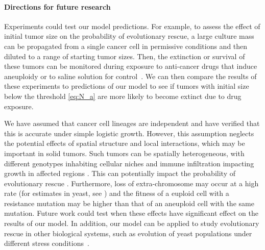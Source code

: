 \documentclass[12pt]{extarticle}
\begin{document}

\paragraph{Directions for future research}
Experiments could test our model predictions. For example, to assess the effect of initial tumor size on the probability of evolutionary rescue, a large culture mass can be propagated from a single cancer cell in permissive conditions and then diluted to a range of starting tumor sizes. Then, the extinction or survival of these tumors can be monitored during exposure to anti-cancer drugs that induce aneuploidy or to saline solution for control~\citep{ippolito2021gene}. 
We can then compare the results of these experiments to predictions of our model to see if tumors with initial size below the threshold \cref{eq:N_a} are more likely to become extinct due to drug exposure.

We have assumed that cancer cell lineages are independent and have verified that this is accurate under simple logistic growth. However, this assumption neglects the potential effects of spatial structure and local interactions, which may be important in solid tumors. Such tumors can be spatially heterogeneous, with different genotypes inhabiting cellular niches and immune infiltration impacting growth in affected regions \citep{varrone2023cellcharter,galon2010immune}. This can potentially impact the probability of evolutionary rescue \citep{martens2011spatial}. 
Furthermore, loss of extra-chromosome may occur at a high rate (for estimates in yeast, see \citet{hose_rate_2024}) and the fitness of a euploid cell with a resistance mutation may be higher than that of an aneuploid cell with the same mutation. Future work could test when these effects have significant effect on the results of our model. %
In addition, our model can be applied to study evolutionary rescue in other biological systems, such as evolution of yeast populations under different stress conditions~\citep{pompei2023fitness,kohanovski2024aneuploidy}. 
\end{document}
